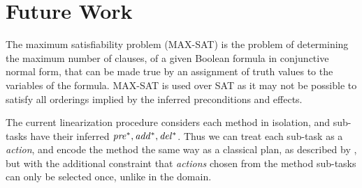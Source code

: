 \section{Future Work}

The maximum satisfiability problem (MAX-SAT) is the problem of determining the maximum number of clauses, of a given Boolean formula in conjunctive normal form, that can be made true by an assignment of truth values to the variables of the formula. MAX-SAT is used over SAT as it may not be possible to satisfy all orderings implied by the inferred preconditions and effects.

The current linearization procedure considers each method in isolation, and sub-tasks have their inferred $\mathit{pre^{*}}, \mathit{add^{*}}, \mathit{del^{*}}$. Thus we can treat each sub-task as a \emph{action}, and encode the method the same way as a classical plan, as described by \cite{RINTANEN201245}, but with the additional constraint that \emph{actions} chosen from the method sub-tasks can only be selected once, unlike in the domain.
